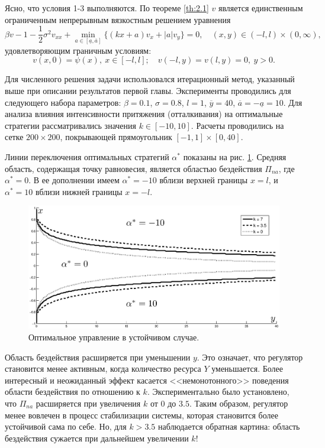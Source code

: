 \documentclass[twoside,12pt]{article}
\begin{document}
Ясно, что условия 1-3 выполняются. По теореме \ref{th:2.1} $v$ является единственным ограниченным непрерывным вязкостным решением уравнения
\begin{equation}
\beta v -1-\frac{1}{2}\sigma^2 v_{xx}+\min_{a \in [\underline a,\overline{a}]}\{(kx+a)v_x+|a|v_y\}=0,\quad (x,y)\in (-l,l)\times(0,\infty),
\end{equation}
удовлетворяющим граничным условиям:
$$ v(x,0)=\psi(x),\ x\in [-l,l];\quad v(-l,y)=v(l,y)=0,\  y>0. $$

Для численного решения задачи использовался итерационный метод, указанный выше при описании результатов первой главы.
Эксперименты проводились для следующего набора параметров: $\beta=0.1$, $\sigma=0.8$, $l=1$, $\overline y=40$, $\overline a=-\underline a=10$. Для анализа влияния интенсивности притяжения (отталкивания) на оптимальные стратегии рассматривались значения $k \in [-10,10]$. Расчеты проводились на сетке $200\times 200$, покрывающей прямоугольник $[-1,1]\times[0,40]$.

Линии переключения оптимальных стратегий $\alpha^*$ показаны на рис. \ref{fig:2.2}. Средняя область, содержащая точку равновесия, является областью бездействия $\Pi_{na}$, где $\alpha^*=0$. В ее дополнении имеем $\alpha^*=-10$ вблизи верхней границы $x=l$, и $\alpha^*=10$ вблизи нижней границы $x=-l$.

\begin{figure}[ht!]
      \centering
          \includegraphics[width=1\textwidth]{images/control_mu.eps}
        \caption{Оптимальное управление в устойчивом случае.}
        \label{fig:2.2}
\end{figure}

Область бездействия расширяется при уменьшении $y$. Это означает, что регулятор становится менее активным, когда количество ресурса $Y$ уменьшается. Более интересный и неожиданный эффект касается <<немонотонного>> поведения области бездействия по отношению к $k$. Экспериментально было установлено, что $\Pi_{na}$ расширяется при увеличения $k$ от $0$ до $3.5$. Таким образом, регулятор менее вовлечен в процесс стабилизации системы, которая становится более устойчивой сама по себе. Но, для $k>3.5$ наблюдается обратная картина: область бездействия сужается при дальнейшем увеличении $k$!
\end{document}
